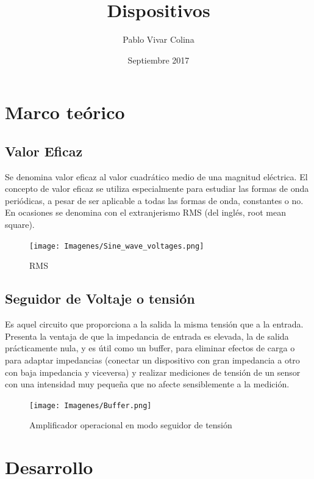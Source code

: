 \documentclass{article}
\title{Dispositivos}
\author{Pablo Vivar Colina}
\date{Septiembre 2017}
\begin{document}


\section{Marco teórico}

\subsection{Valor Eficaz}

Se denomina valor eficaz al valor cuadrático medio de una magnitud eléctrica. El concepto de valor eficaz se utiliza especialmente para estudiar las formas de onda periódicas, a pesar de ser aplicable a todas las formas de onda, constantes o no. En ocasiones se denomina con el extranjerismo RMS (del inglés, root mean square).\citep{valorEficazWiki}\\

 \begin{figure}[h!]
     \centering
     \texttt{[image: Imagenes/Sine\_wave\_voltages.png]}
     \caption{RMS}
     \label{fig:my_label}
 \end{figure}
 
 \subsection{Seguidor de Voltaje o tensión}

Es aquel circuito que proporciona a la salida la misma tensión que a la entrada. Presenta la ventaja de que la impedancia de entrada es elevada, la de salida prácticamente nula, y es útil como un buffer, para eliminar efectos de carga o para adaptar impedancias (conectar un dispositivo con gran impedancia a otro con baja impedancia y viceversa) y realizar mediciones de tensión de un sensor con una intensidad muy pequeña que no afecte sensiblemente a la medición.\citep{AmplificadorOperacional}

\begin{figure}[h!]
    \centering
    \texttt{[image: Imagenes/Buffer.png]}
    \caption{Amplificador operacional en modo seguidor de tensión \citep{AmplificadorOperacional}}
    \label{fig:buffer}
\end{figure}

\section{Desarrollo}
\end{document}
